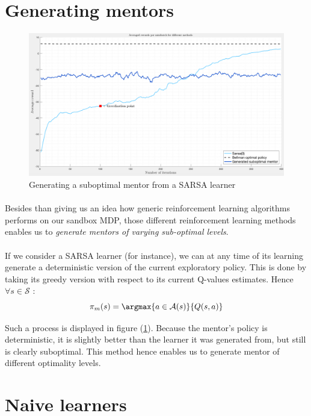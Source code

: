 \documentclass[a4paper]{report}
\begin{document}
{	\section{Generating mentors}
	{
	
		\begin{figure}[h!]
			\begin{center}
				\includegraphics[width=0.7\linewidth]{mentor_gen}
				\caption{Generating a suboptimal mentor from a SARSA learner}
				\label{fig::mentor_gen}
			\end{center}
		\end{figure}
		
		\paragraph{} Besides than giving us an idea how generic reinforcement learning algorithms performs on our sandbox MDP, those different reinforcement learning methods enables us to \emph{generate mentors of varying sub-optimal levels}. 
		
		\paragraph{} If we consider a SARSA learner (for instance), we can at any time of its learning generate a deterministic version of the current exploratory policy. This is done by taking its greedy version with respect to its current Q-values estimates. Hence $\forall s\in\mathcal{S}$ : 
		\begin{equation}
			\pi_m(s) = \argmax{a\in\mathcal{A}(s)}{Q(s,a)}
		\end{equation}
		
		Such a process is displayed in figure (\ref{fig::mentor_gen}). Because the mentor's policy is deterministic, it is slightly better than the learner it was generated from, but still is clearly suboptimal. This method hence enables us to generate mentor of different optimality levels. 
	}
	\section{Naive learners}
	{
		\label{section::naive_learners}
}}
\end{document}
